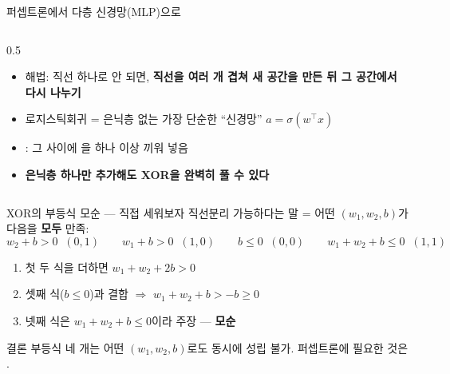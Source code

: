 \documentclass[aspectratio=169,11pt]{beamer}
\begin{document}
\begin{frame}{퍼셉트론에서 다층 신경망(MLP)으로}
  \begin{columns}[T]
    \begin{column}{0.5\textwidth}
      \begin{itemize}
        \item 해법: 직선 하나로 안 되면, \textbf{직선을 여러 개 겹쳐
          새 공간을 만든 뒤 그 공간에서 다시 나누기}
        \item 로지스틱회귀 = 은닉층 없는 가장 단순한 ``신경망'' $a = \sigma(w^\top x)$
        \item {}: 그 사이에 을 하나 이상 끼워 넣음
        \item \textbf{은닉층 하나만 추가해도 XOR을 완벽히 풀 수 있다}
      \end{itemize}
    \end{column}
  \end{columns}
\end{frame}

\begin{frame}{XOR의 부등식 모순 — 직접 세워보자}
  \small
  직선분리 가능하다는 말 = 어떤 $(w_1, w_2, b)$가 다음을 \textbf{모두} 만족:
  \[
  w_2 + b > 0\;\; (0,1) \qquad
  w_1 + b > 0\;\; (1,0) \qquad
  b \le 0\;\; (0,0) \qquad
  w_1 + w_2 + b \le 0\;\; (1,1)
  \]
  \begin{enumerate}
    \item 첫 두 식을 더하면 $w_1 + w_2 + 2b > 0$
    \item 셋째 식($b \le 0$)과 결합 $\Rightarrow$ $w_1 + w_2 + b > -b \ge 0$
    \item 넷째 식은 $w_1 + w_2 + b \le 0$이라 주장 — \textbf{모순}
  \end{enumerate}
  \begin{block}{결론}
    부등식 네 개는 어떤 $(w_1, w_2, b)$로도 동시에 성립 불가.
    퍼셉트론에 필요한 것은 .
  \end{block}
\end{frame}
\end{document}
